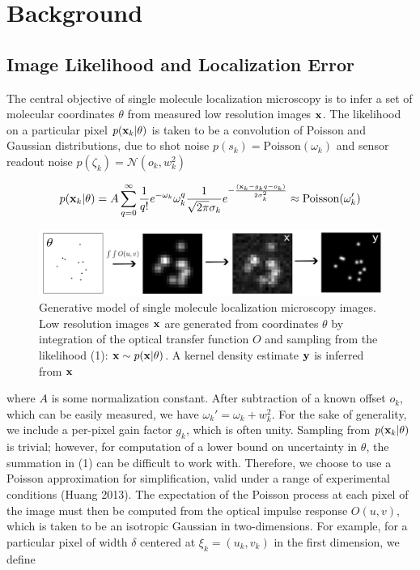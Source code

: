 \documentclass{article}
\begin{document}
\section{Background}

\subsection{Image Likelihood and Localization Error}

The central objective of single molecule localization microscopy is to infer a set of molecular coordinates $\theta$ from measured low resolution images $\bold{x}$. The likelihood on a particular pixel $p(\bold{x}_k|\theta)$ is taken to be a convolution of Poisson and Gaussian distributions, due to shot noise $p(s_{k}) = \mathrm{Poisson}(\omega_{k})$ and sensor readout noise $p(\zeta_{k}) = \mathcal{N}(o_{k},w_{k}^{2})$ 

\begin{equation}
p(\bold{x}_{k}|\theta) = A\sum_{q=0}^{\infty} \frac{1}{q!}e^{-\omega_{k}}\omega_{k}^{q}\frac{1}{\sqrt{2\pi}\sigma_{k}}e^{-\frac{(\bold{x}_{k}-g_{k}q-o_{k})}{2\sigma_{k}^{2}}} \approx \mathrm{Poisson}(\omega_{k}')
\end{equation}


\begin{figure}
\includegraphics[scale=0.225]{Generation.png}
\caption{Generative model of single molecule localization microscopy images. Low resolution images $\bold{x}$ are generated from coordinates $\theta$ by integration of the optical transfer function $O$ and sampling from the likelihood (1): $\bold{x}\sim p(\bold{x}|\theta)$. A kernel density estimate $\bold{y}$ is inferred from $\bold{x}$}
\end{figure}

where $A$ is some normalization constant. After subtraction of a known offset $o_{k}$, which can be easily measured, we have $\omega_{k}' = \omega_{k} + w_{k}^{2}$. For the sake of generality, we include a per-pixel gain factor $g_{k}$, which is often unity. Sampling from $p(\bold{x}_{k}|\theta)$ is trivial; however, for computation of a lower bound on uncertainty in $\theta$, the summation in (1) can be difficult to work with. Therefore, we choose to use a Poisson approximation for simplification, valid under a range of experimental conditions (Huang 2013). The expectation of the Poisson process at each pixel of the image must then be computed from the optical impulse response $O(u,v)$, which is taken to be an isotropic Gaussian in two-dimensions. For example, for a particular pixel of width $\delta$ centered at $\xi_{k}=(u_k,v_k)$ in the first dimension, we define
\end{document}
